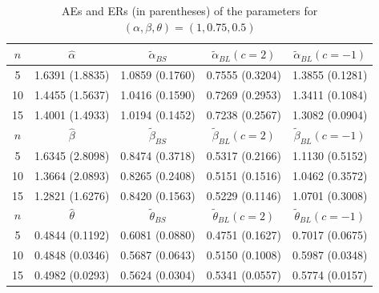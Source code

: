 \documentclass[twoside]{article}
\begin{document}
\begin{table}[!ht]
\centering
\caption{{\small AEs and ERs (in parentheses) of the parameters for $(\alpha, \beta, \theta) = (1, 0.75, 0.5)$}}
{ \small
\begin{tabular}[c]{ccccc}
\hline
$ n $ & ${\hat \alpha}$ & $ {{\tilde \alpha}_{BS}} $ & $ {{\tilde \alpha}_{BL}} (c=2)$ & $ {{\tilde \alpha}_{BL}} (c=-1)$  \\
\hline
5 &1.6391 (1.8835)& 1.0859 (0.1760)& 0.7555 (0.3204)& 1.3855 (0.1281) \\
10 &1.4455 (1.5637)& 1.0416 (0.1590)& 0.7269 (0.2953)& 1.3411 (0.1084) \\
15 &1.4001 (1.4933)& 1.0194 (0.1452)& 0.7238 (0.2567)& 1.3082 (0.0904) \\
\hline
$ n $ & ${\hat \beta}$ & $ {{\tilde \beta}_{BS}} $ & $ {{\tilde \beta}_{BL}} (c=2)$ & $ {{\tilde \beta}_{BL}} (c=-1)$  \\
\hline
5 &1.6345 (2.8098)& 0.8474 (0.3718)& 0.5317 (0.2166)& 1.1130 (0.5152) \\
10 &1.3664 (2.0893)& 0.8265 (0.2408)& 0.5151 (0.1516)& 1.0462 (0.3572) \\
15 &1.2821 (1.6276)& 0.8420 (0.1563)& 0.5229 (0.1146)& 1.0701 (0.3008) \\
\hline
$ n $ & ${\hat \theta}$ & $ {{\tilde \theta}_{BS}} $ & $ {{\tilde \theta}_{BL}} (c=2)$ & $ {{\tilde \theta}_{BL}} (c=-1)$  \\
\hline
5 &0.4844 (0.1192)& 0.6081 (0.0880)& 0.4751 (0.1627)& 0.7017 (0.0675) \\
10 &0.4848 (0.0346)& 0.5687 (0.0643)& 0.5150 (0.1008)& 0.5987 (0.0348) \\
15 &0.4982 (0.0293)& 0.5624 (0.0304)& 0.5341 (0.0557)& 0.5774 (0.0157) \\
\hline
\end{tabular}
}
\end{table}
\end{document}

